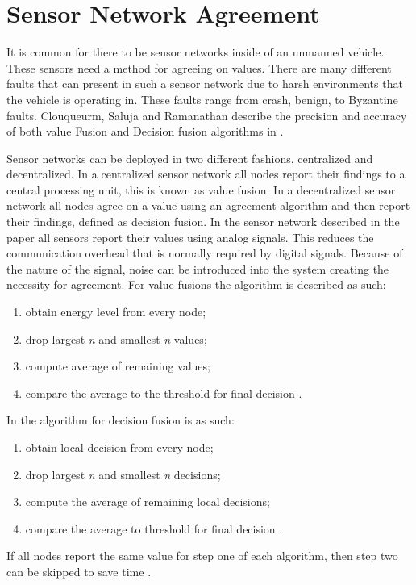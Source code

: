 \documentclass[twoside, conference]{IEEEtran}%
\begin{document}
\section{Sensor Network Agreement}\label{sec:sensornet-agreement}
It is common for there to be sensor networks inside of an unmanned vehicle. These sensors need a method for agreeing on values. There are many different faults that can present in such a sensor network due to harsh environments that the vehicle is operating in. These faults range from crash, benign, to Byzantine faults. Clouqueurm, Saluja and Ramanathan describe the precision and accuracy of both value Fusion and Decision fusion algorithms in \cite{Clouqueur2004}. 

Sensor networks can be deployed in two different fashions, centralized and decentralized. In a centralized sensor network all nodes report their findings to a central processing unit, this is known as value fusion. In a decentralized sensor network all nodes agree on a value using an agreement algorithm and then report their findings, defined as decision fusion. In the sensor network described in the paper all sensors report their values using analog signals. This reduces the communication overhead that is normally required by digital signals. Because of the nature of the signal, noise can be introduced into the system creating the necessity for agreement. For value fusions the algorithm is described as such:
\begin{enumerate}
	\item obtain energy level from every node;
	\item drop largest \textit{n} and smallest \textit{n} values;
	\item compute average of remaining values;
	\item compare the average to the threshold for final decision \cite{Clouqueur2004}.
\end{enumerate}
In \cite{Clouqueur2004} the algorithm for decision fusion is as such:
\begin{enumerate}
	\item obtain local decision from every node;
	\item drop largest \textit{n} and smallest \textit{n} decisions;
	\item compute the average of remaining local decisions;
	\item compare the average to threshold for final decision \cite{Clouqueur2004}.
\end{enumerate}
If all nodes report the same value for step one of each algorithm, then step two can be skipped to save time \cite{Clouqueur2004}.
\end{document}
